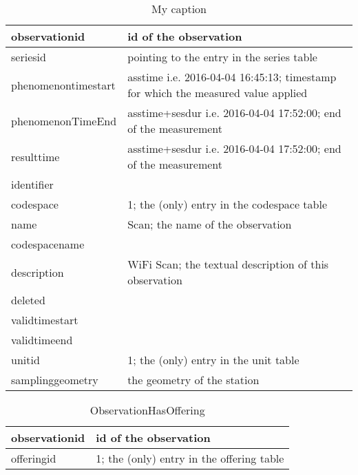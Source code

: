 \begin{table}[]
\centering
\caption{My caption}
\label{my-label}
\begin{tabular}{@{}ll@{}}
\toprule
observationid & id of the observation\\ \midrule
seriesid & pointing to the entry in the series table\\ \midrule
phenomenontimestart & asstime i.e. 2016-04-04 16:45:13; timestamp for which the measured value applied\\ \midrule
phenomenonTimeEnd & asstime+sesdur i.e. 2016-04-04 17:52:00; end of the measurement\\ \midrule
resulttime & asstime+sesdur i.e. 2016-04-04 17:52:00; end of the measurement\\ \midrule
identifier &\\ \midrule
codespace & 1; the (only) entry in the codespace table\\ \midrule
name & Scan; the name of the observation\\ \midrule
codespacename &\\ \midrule
description & WiFi Scan; the textual description of this observation\\ \midrule
deleted &\\ \midrule
validtimestart &\\ \midrule
validtimeend &\\ \midrule
unitid & 1; the (only) entry in the unit table\\ \midrule
samplinggeometry & the geometry of the station\\ \bottomrule
\end{tabular}
\end{table}



\begin{table}[]
\centering
\caption{ObservationHasOffering}
\label{my-label}
\begin{tabular}{@{}ll@{}}
\toprule
\textbf{observationid} & \textbf{id of the observation}            \\ \midrule
offeringid             & 1; the (only) entry in the offering table \\ \bottomrule
\end{tabular}
\end{table}


